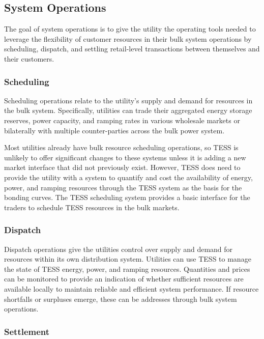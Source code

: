 \subsection{System Operations}

The goal of system operations is to give the utility the operating tools needed to leverage the flexibility of customer resources in their bulk system operations by scheduling, dispatch, and settling retail-level transactions between themselves and their customers.

\subsubsection{Scheduling}

Scheduling operations relate to the utility's supply and demand for resources in the bulk system.  Specifically, utilities can trade their aggregated energy storage reserves, power capacity, and ramping rates in various wholesale markets or bilaterally with multiple counter-parties across the bulk power system.  

Most utilities already have bulk resource scheduling operations, so TESS is unlikely to offer significant changes to these systems unless it is adding a new market interface that did not previously exist.  However, TESS does need to provide the utility with a system to quantify and cost the availability of energy, power, and ramping resources through the TESS system as the basis for the bonding curves.  The TESS scheduling system provides a basic interface for the traders to schedule TESS resources in the bulk markets.

\subsubsection{Dispatch}

Dispatch operations give the utilities control over supply and demand for resources within its own distribution system.  Utilities can use TESS to manage the state of TESS energy, power, and ramping resources. Quantities and prices can be monitored to provide an indication of whether sufficient resources are available locally to maintain reliable and efficient system performance.  If resource shortfalls or surpluses emerge, these can be addresses through bulk system operations.

\subsubsection{Settlement}

